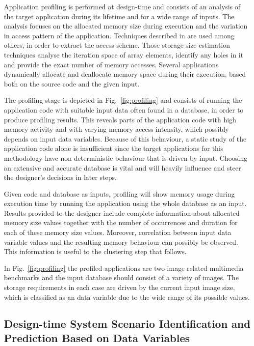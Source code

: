 \documentclass{acm_proc_article-sp}
\begin{document}
Application profiling is performed at design-time and consists of an analysis of the target application during its lifetime and for a wide range of inputs. The analysis focuses on the allocated memory size during execution and the variation in access pattern of the application. Techniques described in \cite{Ang13b} are used among others, in order to extract the access scheme. Those storage size estimation techniques analyse the iteration space of array elements, identify any holes in it and provide the exact number of memory accesses. Several applications dynamically allocate and deallocate memory space during their execution, based both on the source code and the given input. 

The profiling stage is depicted in Fig.~\ref{fig:profiling} and consists of running the application code with suitable input data often found in a database, in order to produce profiling results. This reveals parts of the application code with high memory activity and with varying memory access intensity, which possibly depends on input data variables. Because of this behaviour, a static study of the application code alone is insufficient since the target applications for this methodology have non-deterministic behaviour that is driven by input. Choosing an extensive and accurate database is vital and will heavily influence and steer the designer's decisions in later steps. 

Given code and database as inputs, profiling will show memory usage during execution time by running the application using the whole database as an input. Results provided to the designer include complete information about allocated memory size values together with the number of occurrences and duration for each of these memory size values. Moreover, correlation between input data variable values and the resulting memory behaviour can possibly be observed. This information is useful to the clustering step that follows. 

In Fig.~\ref{fig:profiling} the profiled applications are two image related multimedia benchmarks and the input database should consist of a variety of images. The storage requirements in each case are driven by the current input image size, which is classified as an data variable due to the wide range of its possible values. 

\subsection{Design-time System Scenario Identification and Prediction Based on Data Variables}
\end{document}
